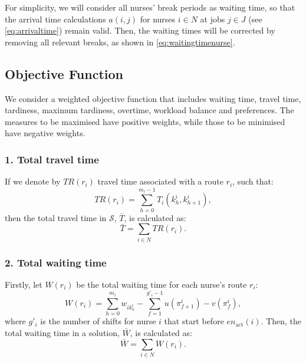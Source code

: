 \documentclass[a4paper,11pt,authoryear]{elsarticle}
\begin{document}

For simplicity, we will consider all nurses' break periods as waiting time, so that the arrival time calculations $a(i,j)$ for nurses $i \in N$ at jobs $j \in J$ (see \eqref{eq:arrivaltime}) remain valid. Then, the waiting times will be corrected by removing all relevant breaks, as shown in \eqref{eq:waitingtimenurse}.


\subsection{Objective Function}
\label{sub:objectivefunc}
\noindent We consider a weighted objective function that includes waiting time, travel time, tardiness, maximum tardiness, overtime, workload balance and preferences. The measures to be maximised have positive weights, while those to be minimised have negative weights.

\subsubsection*{1. Total travel time}
\noindent If we denote by $TR(r_i)$ travel time associated with a route $r_i$, such that:
\begin{equation}
	TR(r_i) =  \sum_{h = 0}^{m_i - 1} T_i(k^i_h, k^i_{h + 1}), \label{eq:traveltimenurse}
\end{equation}
then the total travel time in $\mathcal{S}$, $\bar{T}$, is calculated as:
\begin{equation}
	\bar{T} = \sum_{i \in N}  TR(r_i). \label{eq:totaltraveltime}
\end{equation}

\subsubsection*{2. Total waiting time}
\noindent Firstly, let $W(r_i)$ be the total waiting time for each nurse's route $r_i$:
\begin{equation}
	W(r_i) = \displaystyle\sum_{h=0}^{m_i} w_{i k_{h}^i} - \displaystyle\sum_{f=1}^{g'_i - 1} u(\pi_{f+1}^i) - v(\pi_f^i), \label{eq:waitingtimenurse}
\end{equation}
\noindent where $g'_i$ is the number of shifts for nurse $i$ that start before $en_{\text{act}}(i)$. Then, the total waiting time in a solution, $\bar{W}$, is calculated as:
\begin{equation}
     \bar{W} = \sum_{i \in N} W(r_i). \label{eq:totalwaitingtime}
\end{equation}
\end{document}
